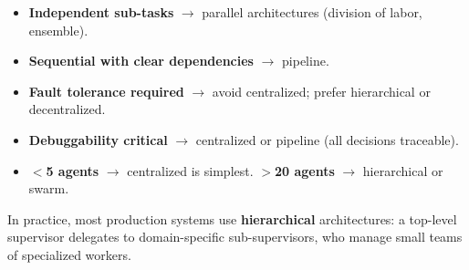 \begin{table}[ht!]
\centering
\caption{Multi-agent architecture patterns compared across key dimensions. Ratings: \textbf{H}igh / \textbf{M}edium / \textbf{L}ow.}
\end{table}

\begin{keybox}
\begin{itemize}
  \item \textbf{Independent sub-tasks} $\rightarrow$ parallel architectures (division of labor, ensemble).
  \item \textbf{Sequential with clear dependencies} $\rightarrow$ pipeline.
  \item \textbf{Fault tolerance required} $\rightarrow$ avoid centralized; prefer hierarchical or decentralized.
  \item \textbf{Debuggability critical} $\rightarrow$ centralized or pipeline (all decisions traceable).
  \item \textbf{$<$5 agents} $\rightarrow$ centralized is simplest. \textbf{$>$20 agents} $\rightarrow$ hierarchical or swarm.
\end{itemize}

In practice, most production systems use \textbf{hierarchical} architectures: a top-level supervisor delegates to domain-specific sub-supervisors, who manage small teams of specialized workers.
\end{keybox}

